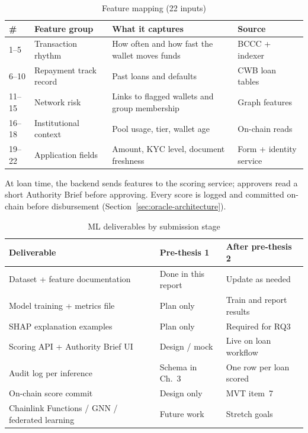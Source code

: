 \documentclass[12pt, a4paper]{report}
\newcommand{\tableheadcolor}{\rowcolor{TableHeadBg}}
\begin{document}
\begin{table}[H]
\centering
\caption[Feature mapping (22 inputs)]{Feature mapping (22 inputs)}
\label{tab:ml-feature-mapping}
\footnotesize
\begin{tabular}{p{0.4cm}p{4.2cm}p{5.8cm}p{3.8cm}}
\toprule
\tableheadcolor
\textbf{\#} & \textbf{Feature group} & \textbf{What it captures} & \textbf{Source} \\
\midrule
1--5 & Transaction rhythm & How often and how fast the wallet moves funds & BCCC + indexer \\
6--10 & Repayment track record & Past loans and defaults & CWB loan tables \\
11--15 & Network risk & Links to flagged wallets and group membership & Graph features \\
16--18 & Institutional context & Pool usage, tier, wallet age & On-chain reads \\
19--22 & Application fields & Amount, KYC level, document freshness & Form + identity service \\
\bottomrule
\end{tabular}
\end{table}

At loan time, the backend sends features to the scoring service; approvers read a short Authority Brief before approving. Every score is logged and committed on-chain before disbursement (Section~\ref{sec:oracle-architecture}).

\begin{table}[H]
\centering
\caption[ML deliverables by submission stage]{ML deliverables by submission stage}
\begin{tabular}{p{4.8cm}p{4.0cm}p{4.4cm}}
\toprule
\tableheadcolor
\textbf{Deliverable} & \textbf{Pre-thesis 1} & \textbf{After pre-thesis 2} \\
\midrule
Dataset + feature documentation & Done in this report & Update as needed \\
Model training + metrics file & Plan only & Train and report results \\
SHAP explanation examples & Plan only & Required for RQ3 \\
Scoring API + Authority Brief UI & Design / mock & Live on loan workflow \\
Audit log per inference & Schema in Ch.~3 & One row per loan scored \\
On-chain score commit & Design only & MVT item~7 \\
Chainlink Functions / GNN / federated learning & Future work & Stretch goals \\
\bottomrule
\end{tabular}
\end{table}
\end{document}
